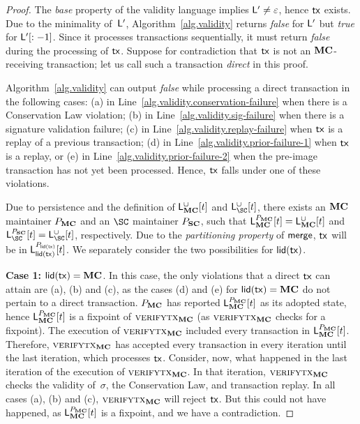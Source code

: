 \begin{proof}
  The \emph{base} property of the validity language implies $\LState' \neq
  \eps$, hence $\tx$ exists. Due to the minimality of~$\LState'$,
  Algorithm~\ref{alg.validity} returns \emph{false} for $\LState'$ but
  \emph{true} for $\LState'[:-1]$. Since it processes transactions sequentially,
  it must return \emph{false} during the processing of $\tx$. Suppose for
  contradiction that $\tx$ is not an $\MC$-receiving transaction; let us call
  such a transaction \emph{direct} in this proof.

  Algorithm~\ref{alg.validity} can output \emph{false} while processing a direct
  transaction in the following cases: (a) in
  Line~\ref{alg.validity.conservation-failure} when there is a Conservation Law
  violation; (b) in Line~\ref{alg.validity.sig-failure} when there is a
  signature validation failure; (c) in Line~\ref{alg.validity.replay-failure}
  when $\tx$ is a replay of a previous transaction; (d) in
  Line~\ref{alg.validity.prior-failure-1} when $\tx$ is a replay, or (e) in
  Line~\ref{alg.validity.prior-failure-2} when the pre-image transaction has not
  yet been processed. Hence, $\tx$ falls under one of these violations.

  Due to persistence and the definition of $\LState_{\MC}^{\cup}[t]$ and
  $\LState_{\SC}^{\cup}[t]$, there exists an $\MC$ maintainer $\party_\MC$ and
  an $\SC$
  maintainer $\party_\Sidechain$, such that
  $\LState_{\MC}^{\party_\MC}[t] = \LState_{\MC}^{\cup}[t]$
  and
  $\LState_{\SC}^{\party_\Sidechain}[t] = \LState_{\SC}^{\cup}[t]$,
  respectively.
  Due to the \emph{partitioning property} of $\merge$, $\tx$ will be in
  $\LState_{\llid(\tx)}^{\party_{\llid(\tx)}}[t]$.
  We separately consider the two possibilities for $\llid(\tx)$.

  \textbf{Case 1: } $\llid(\tx) = \MC$.
  In this case, the only violations that a direct $\tx$ can attain
  are (a), (b) and (c), as the cases (d) and (e) for $\llid(\tx) = \MC$ do not
  pertain to a direct transaction. $\party_\MC$ has reported
  $\LState_\MC^{\party_\MC}[t]$ as its adopted state, hence
  $\LState_\MC^{\party_\MC}[t]$ is a fixpoint of $\textsc{verifytx}_\MC$ (as
  $\textsc{verifytx}_\MC$ checks for a fixpoint). The execution of
  $\textsc{verifytx}_\MC$ included every transaction in
  $\LState_\MC^{\party_\MC}[t]$.
  Therefore, $\textsc{verifytx}_\MC$ has accepted every transaction in every
  iteration until the last iteration, which processes $\tx$.
  Consider, now, what happened in the last iteration of the execution of
  $\textsc{verifytx}_\MC$.
  In that iteration, $\textsc{verifytx}_\MC$ checks the
  validity of~$\sigma$, the Conservation Law, and transaction replay. In
  all cases (a), (b) and (c), $\textsc{verifytx}_\MC$ will reject $\tx$. But
  this could not have happened, as $\LState_\MC^{\party_\MC}[t]$ is a fixpoint,
  and we have a contradiction.


\end{proof}
